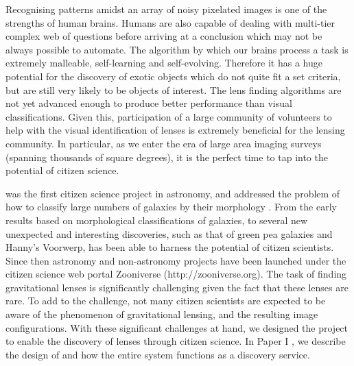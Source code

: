 \documentclass[useAMS,usenatbib,a4paper]{mn2e}
\begin{document}
Recognising patterns amidst an array of noisy pixelated images is one of the
strengths of human brains. Humans are also capable of dealing with
multi-tier complex web of questions before arriving at a conclusion which may
not be always possible to automate. The algorithm by which our brains process a
task is extremely malleable, self-learning and self-evolving. Therefore it has
a huge potential for the discovery of exotic objects which do not quite fit a
set criteria, but are still very likely to be objects of interest. The lens
finding algorithms are not yet advanced enough to produce better performance
than visual classifications. Given this, participation of a large community of
volunteers to help with the visual identification of lenses is extremely
beneficial for the lensing community. In particular, as we enter the era of
large area imaging surveys (spanning thousands of square degrees), it is
the perfect time to tap into the potential of citizen science.

\GZ was the first citizen science project in astronomy, and addressed the
problem of how to  classify large numbers of galaxies by their morphology
\citep{Lintott2008}.  From the early results based on morphological
classifications of galaxies, to several new unexpected and interesting
discoveries, such as that of green pea galaxies and Hanny's Voorwerp, \GZ
has been able to harness the potential of citizen scientists.  Since then
astronomy and non-astronomy projects have been launched under the citizen
science web portal Zooniverse (http://zooniverse.org). The task of finding
gravitational lenses is significantly challenging given the fact that these
lenses are rare. To add to the challenge, not many citizen scientists are
expected to be aware of the phenomenon of gravitational lensing, and the
resulting image configurations.  With these significant challenges at hand, we
designed the \sw project to enable the discovery of lenses through citizen
science.  In Paper I \citep{Marshall2015}, we describe the design of \sw and how the entire
system functions as a discovery service.
\end{document}
